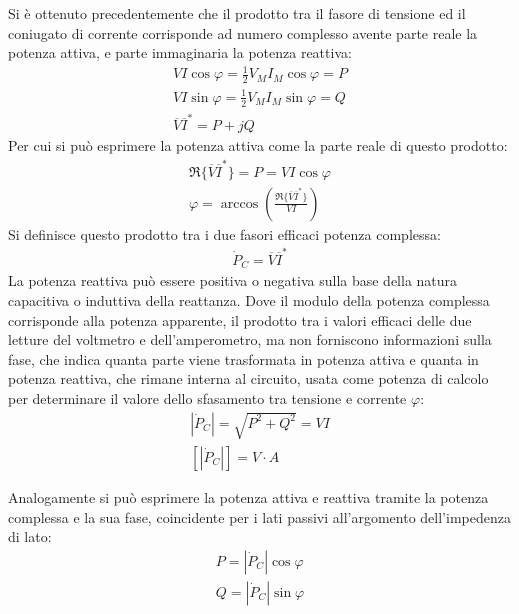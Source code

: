 \documentclass{article}
\numberwithin{equation}{subsection}
\begin{document}
Si è ottenuto precedentemente che il prodotto tra il fasore di tensione ed il coniugato di corrente corrisponde ad numero complesso avente parte reale la potenza attiva, e 
parte immaginaria la potenza reattiva:
\begin{gather*}
    VI\cos\varphi=\displaystyle\frac{1}{2}V_MI_M\cos\varphi=P\\
    VI\sin\varphi=\displaystyle\frac{1}{2}V_MI_M\sin\varphi=Q\\
    \overline{V}\overline{I}^*=P+jQ
\end{gather*}
Per cui si può esprimere la potenza attiva come la parte reale di questo prodotto:
\begin{gather*}
    \Re\{\overline{V}\overline{I}^*\}=P=VI\cos\varphi\\
    \varphi=\arccos\left(\displaystyle\frac{\Re\{\overline{V}\overline{I}^*\}}{VI}\right)
\end{gather*}
Si definisce questo prodotto tra i due fasori efficaci potenza complessa:
\begin{gather*}
    \dot P_C=\overline{V}\overline{I}^*
\end{gather*}
La potenza reattiva può essere positiva o negativa sulla base della natura capacitiva o induttiva della reattanza. 
Dove il modulo della potenza complessa corrisponde alla potenza apparente, il prodotto tra i valori efficaci delle due letture del voltmetro e dell'amperometro, ma non forniscono 
informazioni sulla fase, che indica quanta parte viene trasformata in potenza attiva e quanta in potenza reattiva, che rimane interna al circuito, usata come potenza di 
calcolo per determinare il valore dello sfasamento tra tensione e corrente $\varphi$: 
\begin{gather*}
    |\dot P_C|=\displaystyle\sqrt{P^2+Q^2}=VI\\
    \left[|\dot P_C|\right]=V\cdot A
\end{gather*}
\begin{center}
\end{center}
Analogamente si può esprimere la potenza attiva e reattiva tramite la potenza complessa e la sua fase, coincidente per i lati passivi all'argomento dell'impedenza di lato:
\begin{gather*}
    P=|\dot P_C|\cos\varphi\\
    Q=|\dot P_C|\sin\varphi
\end{gather*}
\end{document}
